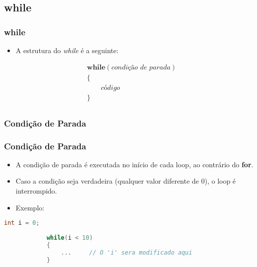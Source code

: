 \subsection{while}

\begin{frame}
    \frametitle{while}
    
        \begin{itemize}
            \item A estrutura do \textit{while} é a seguinte:
        \end{itemize}
    
        \begin{equation*}
            \begin{aligned}
                & \bm{while} ( \textit{condição de parada} ) \\
                & \{ \\
                & \qquad \textit{código} \\
                & \} \\
            \end{aligned}
          \end{equation*}
    
\end{frame}
    



\subsubsection{Condição de Parada}

\begin{frame}[fragile]
    \frametitle{Condição de Parada}
    
        \begin{itemize}
            
            \item A condição de parada é executada no início de cada loop, ao contrário do \textbf{for}.

            \item Caso a condição seja verdadeira (qualquer valor diferente de 0), o loop é interrompido.
    
            \item Exemplo:
    
        \end{itemize}
    
        \begin{lstlisting}[language=C]
            int i = 0;
    
            while(i < 10)
            {
                ...     // O 'i' sera modificado aqui
            }
        \end{lstlisting}
    
\end{frame}



